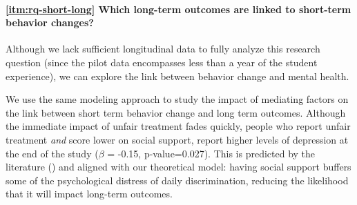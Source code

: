\paragraph{\ref{itm:rq-short-long} Which long-term outcomes are linked to short-term behavior changes?}
Although we lack sufficient longitudinal data to fully analyze this research question (since the pilot data encompasses less than a year of the student experience), we can explore the link between behavior change and mental health. 

We use the same modeling approach to study the impact of mediating factors on the link between short term behavior change and long term outcomes. Although the immediate impact of unfair treatment fades quickly, people who report unfair treatment \textit{and} score lower on social support, report higher levels of depression at the end of the study ($\beta$ = -0.15, p-value=0.027). This is predicted by the literature  (\eg \cite{Mossakowski:2014}) and aligned with our theoretical model: having social support buffers some of the psychological distress of daily discrimination, reducing the likelihood that it will impact long-term outcomes.

